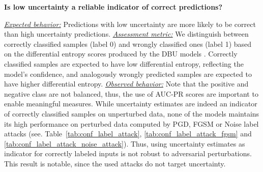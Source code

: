 \begin{center}
	\textbf{Is low uncertainty a reliable indicator of correct predictions?}
\end{center}
\underline{\emph{Expected behavior:}}  Predictions with low uncertainty are more likely to be correct than high uncertainty predictions. 
\underline{\emph{Assessment metric:}} We distinguish between correctly classified samples (label 0) and wrongly classified ones (label 1) based on the differential entropy scores produced by the DBU models \citep{malini2018}. Correctly classified samples are expected to have low differential entropy, reflecting the model's confidence, and analogously wrongly predicted samples are expected to have higher differential entropy. 
\underline{\emph{Observed behavior:}} Note that the positive and negative class are not balanced, thus, the use of AUC-PR scores \citep{imbalance_apr} are important to enable meaningful measures. While uncertainty estimates are indeed an indicator of correctly classified samples on unperturbed data, none of the models maintains its high performance on perturbed data computed by PGD, FGSM or Noise label attacks (see. Table~\ref{tab:conf_label_attack}, \ref{tab:conf_label_attack_fgsm} and \ref{tab:conf_label_attack_noise_attack}). Thus, using uncertainty estimates as indicator for correctly labeled inputs is not robust to adversarial perturbations. This result is notable, since the used attacks do not target uncertainty. 





